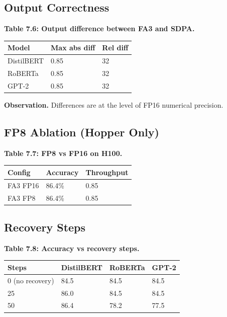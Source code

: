 \subsection{Output Correctness}

\textbf{Table 7.6: Output difference between FA3 and SDPA.}

\begin{table}[H]
\centering
\small
\begin{tabular}{lll}
\toprule
\textbf{Model} & \textbf{Max abs diff} & \textbf{Rel diff} \\
\midrule
DistilBERT & 0.85 & 32 \\
RoBERTa & 0.85 & 32 \\
GPT-2 & 0.85 & 32 \\
\bottomrule
\end{tabular}
\end{table}

\textbf{Observation.} Differences are at the level of FP16 numerical precision.

\subsection{FP8 Ablation (Hopper Only)}

\textbf{Table 7.7: FP8 vs FP16 on H100.}

\begin{table}[H]
\centering
\small
\begin{tabular}{lll}
\toprule
\textbf{Config} & \textbf{Accuracy} & \textbf{Throughput} \\
\midrule
FA3 FP16 & 86.4\% & 0.85 \\
FA3 FP8 & 86.4\% & 0.85 \\
\bottomrule
\end{tabular}
\end{table}

\subsection{Recovery Steps}

\textbf{Table 7.8: Accuracy vs recovery steps.}

\begin{table}[H]
\centering
\small
\begin{tabular}{llll}
\toprule
\textbf{Steps} & \textbf{DistilBERT} & \textbf{RoBERTa} & \textbf{GPT-2} \\
\midrule
0 (no recovery) & 84.5 & 84.5 & 84.5 \\
25 & 86.0 & 84.5 & 84.5 \\
50 & 86.4 & 78.2 & 77.5 \\
\bottomrule
\end{tabular}
\end{table}

